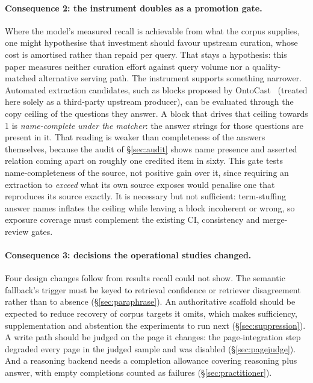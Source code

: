 \documentclass[10pt,twocolumn]{article}
\begin{document}
\paragraph{Consequence 2: the instrument doubles as a promotion gate.} Where the model's measured recall is achievable from what the corpus supplies, one might hypothesise that investment should favour upstream curation, whose cost is amortised rather than repaid per query. That stays a hypothesis: this paper measures neither curation effort against query volume nor a quality-matched alternative serving path. The instrument supports something narrower. Automated extraction candidates, such as blocks proposed by OntoCast~\cite{ontocast} (treated here solely as a third-party upstream producer), can be evaluated through the copy ceiling of the questions they answer. A block that drives that ceiling towards 1 is \emph{name-complete under the matcher}: the answer strings for those questions are present in it. That reading is weaker than completeness of the answers themselves, because the audit of \S\ref{sec:audit} shows name presence and asserted relation coming apart on roughly one credited item in sixty. This gate tests name-completeness of the source, not positive gain over it, since requiring an extraction to \emph{exceed} what its own source exposes would penalise one that reproduces its source exactly. It is necessary but not sufficient: term-stuffing answer names inflates the ceiling while leaving a block incoherent or wrong, so exposure coverage must complement the existing CI, consistency and merge-review gates.

\paragraph{Consequence 3: decisions the operational studies changed.} Four design changes follow from results recall could not show. The semantic fallback's trigger must be keyed to retrieval confidence or retriever disagreement rather than to absence (\S\ref{sec:paraphrase}). An authoritative scaffold should be expected to reduce recovery of corpus targets it omits, which makes sufficiency, supplementation and abstention the experiments to run next (\S\ref{sec:suppression}). A write path should be judged on the page it changes: the page-integration step degraded every page in the judged sample and was disabled (\S\ref{sec:pagejudge}). And a reasoning backend needs a completion allowance covering reasoning plus answer, with empty completions counted as failures (\S\ref{sec:practitioner}).
\end{document}

